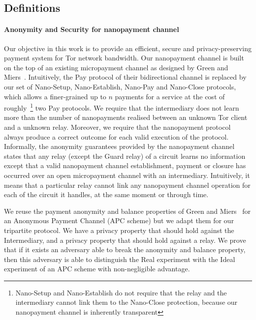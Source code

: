 
\subsection{Definitions}

\paragraph*{Anonymity and Security for nanopayment channel}

Our objective in this work is to provide an efficient, secure and privacy-preserving payment system for Tor network bandwidth. Our nanopayment channel is built on the top of an existing micropayment channel as designed by Green and Miers~\cite{}. Intuitively, the Pay protocol of their bidirectional channel is replaced by our set of Nano-Setup, Nano-Establish, Nano-Pay and Nano-Close protocols, which allows a finer-grained up to $n$ payments for a service at the cost of roughly~\footnote{Nano-Setup and Nano-Establish do not require that the relay and the intermediary cannot link them to the Nano-Close protection, because our nanopayment channel is inherently transparent} two Pay protocols.
We require that the intermediary does not learn more than the number of nanopayments realised between an unknown Tor client and a unknown relay. Moreover, we require that the nanopayment protocol always produce a correct outcome for each valid execution of the protocol.
Informally, the anonymity guarantees provided by the nanopayment channel states that any relay (except the Guard relay) of a circuit learns no information except that a valid nanopayment channel establishment, payment or closure has occurred over an open micropayment channel with an intermediary. Intuitively, it means that a particular relay cannot link any nanopayment channel operation for each of the circuit it handles, at the same moment or through time.

We reuse the payment anonymity and balance properties of Green and Miers~\cite{bolt-eprint} for an Anonymous Payment Channel (APC scheme) but we adapt them for our tripartite protocol. We have a privacy property that should hold against the Intermediary, and a privacy property that should hold against a relay.
We prove that if it exists an adversary able to break the anonymity and balance property, then this adversary is able to distinguish the Real experiment with the Ideal experiment of an APC scheme with non-negligible advantage.

